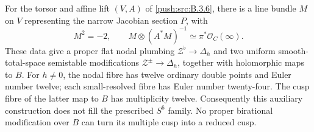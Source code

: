 \begin{proposition}\label{push:src:B.3.7}\label{push:B37}
For the torsor and affine lift $(V,A)$
of \ref{push:src:B.3.6}, there is a line bundle $M$ on
$V$ representing the narrow Jacobian
section $P$, with
\[
 M^2=-2,\qquad
 M\otimes(A^*M)^{-1}
       \simeq\pi^*\mathcal O_C(\infty).
\]
These data give a proper flat nodal
plumbing $\mathcal Z^\flat\to\Delta_h$
and two uniform smooth-total-space
semistable modifications
$\mathcal Z^\pm\to\Delta_h$, together
with holomorphic maps to $B$.
For $h\ne0$, the nodal fibre has
twelve ordinary double points and
Euler number twelve; each small-resolved
fibre has Euler number twenty-four.
The cusp fibre of the latter map to
$B$ has multiplicity twelve.
Consequently this auxiliary construction
does not fill the prescribed $S^6$
family. No proper birational modification
over $B$ can turn its multiple cusp
into a reduced cusp.
\end{proposition}

